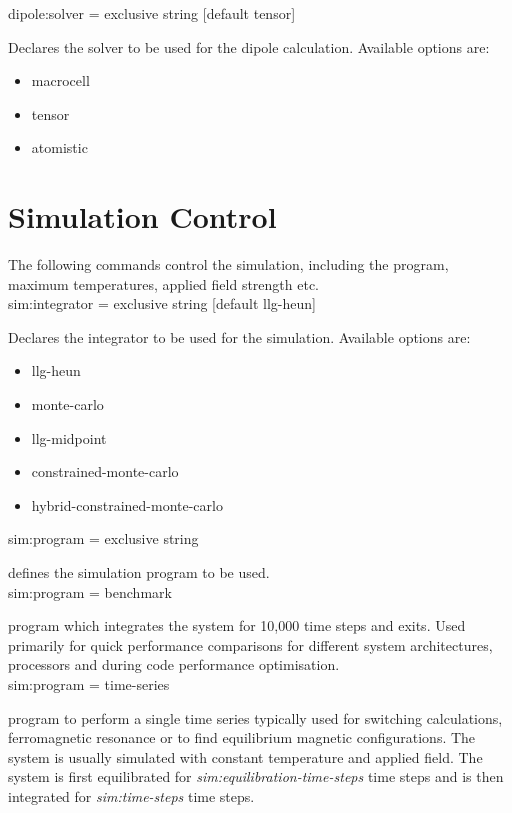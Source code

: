 {\zicf dipole:solver = exclusive string [default tensor]}
Declares the solver to be used for the dipole calculation. Available options are:
\begin{itemize}
  \item[] macrocell
  \item[] tensor
  \item[] atomistic
\end{itemize}

\section*{Simulation Control}
The following commands control the simulation, including the program, maximum temperatures, applied field strength etc.\\

{\zicf sim:integrator = exclusive string [default llg-heun]} Declares the integrator to be used for the simulation. Available options are:
\begin{itemize}
  \item[] llg-heun
  \item[] monte-carlo
  \item[] llg-midpoint
  \item[] constrained-monte-carlo
  \item[] hybrid-constrained-monte-carlo
\end{itemize}

{\zicf sim:program = exclusive string} defines the simulation program to be used.\\

{\zicf sim:program = benchmark} program which integrates the system for 10,000 time steps and exits. Used primarily for quick performance comparisons for different system architectures, processors and during code performance optimisation.\\

{\zicf sim:program = time-series} program to perform a single time series typically used for switching calculations, ferromagnetic resonance or to find equilibrium magnetic configurations. The system is usually simulated with constant temperature and applied field. The system is first equilibrated for \textit{sim:equilibration-time-steps} time steps and is then integrated for \textit{sim:time-steps} time steps.\\

